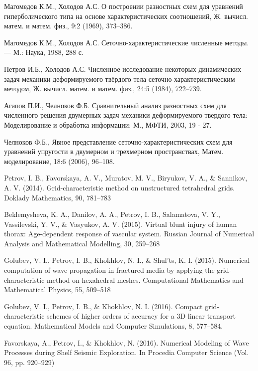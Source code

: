 \documentclass[a4paper]{article}
\numberwithin{equation}{section}
\begin{document}
\begin{thebibliography}{99}
 Магомедов К.М., Холодов А.С. 
О построении разностных схем для уравнений гиперболического типа 
на основе характеристических соотношений, 
Ж. вычисл. матем. и матем. физ., 9:2 (1969), 373–386.

 Магомедов К.М., Холодов А.С. 
Сеточно-характеристические численные методы. — М.: Наука, 1988, 288 с.

 Петров И.Б., Холодов А.С. 
Численное исследование некоторых динамических задач механики деформируемого 
твёрдого тела сеточно-характеристическим методом, 
Ж. вычисл. матем. и матем. физ., 24:5 (1984), 722–739.

 Агапов П.И., Челноков Ф.Б. 
Сравнительный анализ разностных схем для численного решения 
двумерных задач механики деформируемого твердого тела: 
Моделирование и обработка информации: М., МФТИ, 2003, 19 - 27.

 Челноков Ф.Б., Явное представление 
сеточно-характеристических схем для уравнений упругости в двумерном и
 трехмерном пространствах, Матем. моделирование, 18:6 (2006), 96–108.

Petrov, I. B., Favorskaya, A. V., Muratov, M. V., Biryukov, V. A., \& Sannikov, A. V. (2014). 
Grid-characteristic method on unstructured tetrahedral grids. Doklady Mathematics, 90, 781–783

 Beklemysheva, K. A., Danilov, A. A., Petrov, I. B., 
Salamatova, V. Y., Vassilevski, Y. V., \& Vasyukov, A. V. (2015). 
Virtual blunt injury of human thorax: Age-dependent response of vascular system. 
Russian Journal of Numerical Analysis and Mathematical Modelling, 30, 259–268

 Golubev, V. I., Petrov, I. B., Khokhlov, N. I., \& Shul’ts, K. I. (2015). 
Numerical computation of wave propagation in fractured media 
by applying the grid-characteristic method on hexahedral meshes. 
Computational Mathematics and Mathematical Physics, 55, 509–518

 Golubev, V. I., Petrov, I. B., \& Khokhlov, N. I. (2016). 
Compact grid-characteristic schemes of higher orders of accuracy for a 3D linear transport equation. 
Mathematical Models and Computer Simulations, 8, 577–584. 

 Favorskaya, A., Petrov, I., \& Khokhlov, N. (2016). 
Numerical Modeling of Wave Processes during Shelf Seismic Exploration. 
In Procedia Computer Science (Vol. 96, pp. 920–929)


\end{thebibliography}
\end{document}
